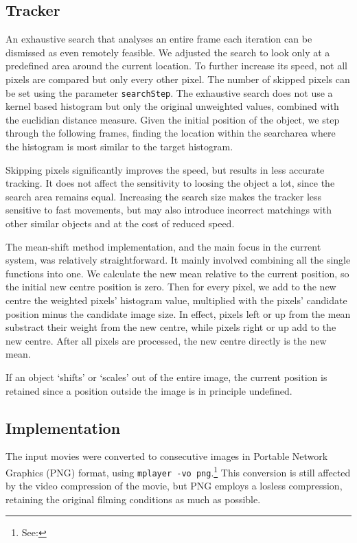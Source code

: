\documentclass[a4paper,11pt]{article}
\begin{document}
\subsection{Tracker}
\label{sec:application:tracker}
An exhaustive search that analyses an entire frame each iteration can be dismissed as even remotely feasible.
We adjusted the search to look only at a predefined area around the current location.
To further increase its speed, not all pixels are compared but only every other pixel.
The number of skipped pixels can be set using the parameter \texttt{searchStep}.
The exhaustive search does not use a kernel based histogram but only the original unweighted values, combined with the euclidian distance measure.
Given the initial position of the object, we step through the following frames, finding the location within the searcharea where the histogram is most similar to the target histogram.

Skipping pixels significantly improves the speed, but results in less accurate tracking.
It does not affect the sensitivity to loosing the object a lot, since the search area remains equal.
Increasing the search size makes the tracker less sensitive to fast movements, but may also introduce incorrect matchings with other similar objects and at the cost of reduced speed.

The mean-shift method implementation, and the main focus in the current system, was relatively straightforward.
It mainly involved combining all the single functions into one.
We calculate the new mean relative to the current position, so the initial new centre position is zero.
Then for every pixel, we add to the new centre the weighted pixels' histogram value, multiplied with the pixels' candidate position minus the candidate image size.
In effect, pixels left or up from the mean substract their weight from the new centre, while pixels right or up add to the new centre.
After all pixels are processed, the new centre directly is the new mean.

If an object `shifts' or `scales' out of the entire image, the current position is retained since a position outside the image is in principle undefined.

\subsection{Implementation}
\label{sec:application:implementation}
The input movies were converted to consecutive images in Portable Network Graphics (PNG) format, using \texttt{mplayer -vo png}.\footnote{See: }
This conversion is still affected by the video compression of the movie, but PNG employs a losless compression, retaining the original filming conditions as much as possible.
\end{document}
